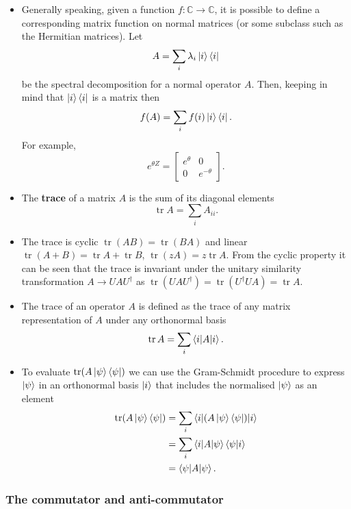 \documentclass{article}
\newcommand{\tr}{\operatorname{tr}}
\begin{document}
\begin{itemize}
  \item Generally speaking, given a function $f : \mathbb{C} \rightarrow \mathbb{C}$, it is possible to define a corresponding matrix function on normal matrices (or some subclass such as the Hermitian matrices). Let \[A = \sum_i \lambda_i \ket{i} \bra{i}\] be the spectral decomposition for a normal operator $A$. Then, keeping in mind that $\ket{i} \bra{i}$ is a matrix then \[f(A) = \sum_i f(i) \ket{i} \bra{i}.\] For example, \[e^{\theta Z} = \begin{bmatrix}
            e^\theta & 0           \\
            0        & e^{-\theta}
          \end{bmatrix}.\]

  \item The \textbf{trace} of a matrix $A$ is the sum of its diagonal elements \[\tr A = \sum_i A_{i i}.\]

  \item The trace is cyclic $\tr (A B) = \tr (B A)$ and linear $\tr (A + B) = \tr A + \tr B$, $\tr (z A) = z \tr A$. From the cyclic property it can be seen that the trace is invariant under the unitary similarity transformation $A \rightarrow U A U^\dag$ as $\tr (U A U^\dag) = \tr (U^\dag U A) = \tr A$.

  \item The trace of an operator $A$ is defined as the trace of any matrix representation of $A$ under any orthonormal basis \[\tr A = \sum_i \braket{i | A | i}.\]

  \item To evaluate $\tr (A \ket{\psi} \bra{\psi})$ we can use the Gram-Schmidt procedure to express $\ket{\psi}$ in an orthonormal basis $\ket{i}$ that includes the normalised $\ket{\psi}$ as an element \begin{align*}
          \tr (A \ket{\psi} \bra{\psi}) & = \sum_i \braket{i | (A \ket{\psi} \bra{\psi}) | i} \\
                                        & = \sum_i \braket{i | A | \psi} \braket{\psi | i}    \\
                                        & = \braket{\psi | A | \psi}.
        \end{align*}
\end{itemize}

\subsubsection{The commutator and anti-commutator}
\end{document}

